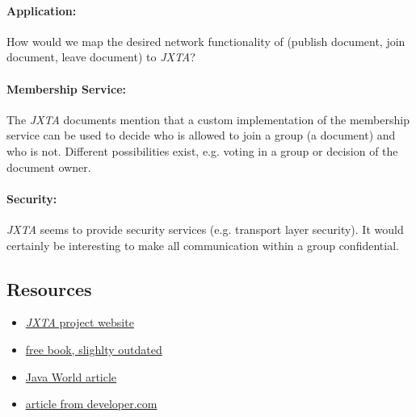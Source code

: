 \paragraph{Application:} How would we map the desired network functionality of \ace (publish document, join document, leave document) to \emph{JXTA}?

\paragraph{Membership Service:} The \emph{JXTA} documents mention that a custom implementation of the membership service can be used to decide who is allowed to join a group (a document) and who is not. Different possibilities exist, e.g. voting in a group or decision of the document owner.

\paragraph{Security:} \emph{JXTA} seems to provide security services (e.g. transport layer security). It would certainly be interesting to make all communication within a group confidential.



\subsection{Resources}
\begin{itemize}
 \item \href{http://www.jxta.org/}{\emph{JXTA} project website}
 \item \href{http://www.brendonwilson.com/projects/jxta/}{free book, slighlty outdated}
 \item \href{http://www.javaworld.com/javaworld/jw-05-2005/jw-0509-jxta.html}{Java World article}
 \item \href{http://www.developer.com/java/other/article.php/1450221}{article from developer.com}
\end{itemize}
